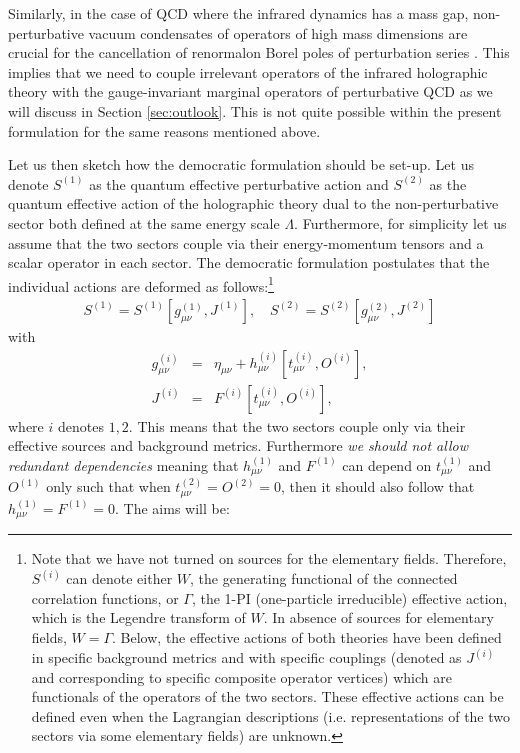 \documentclass[prd,reprint,a4paper,showpacs,superscriptaddress,11pt,onecolumn,nofootinbib]{revtex4-1}
\renewcommand{\(}{\left(}
\renewcommand{\)}{\right)}
\newcommand{\6}{\partial}
\begin{document}
Similarly, in the case of QCD where the infrared dynamics has a mass gap, non-perturbative vacuum condensates of operators of high mass dimensions are crucial for the cancellation of renormalon Borel poles of perturbation series \cite{Parisi:1978bj,Shifman:1978bx,citeulike:9712091}. This implies that we need to couple irrelevant operators of the infrared holographic theory with the gauge-invariant marginal operators of perturbative QCD as we will discuss in Section \ref{sec:outlook}. This is not quite possible within the present formulation for the same reasons mentioned above.

Let us then sketch how the democratic formulation should be set-up. Let us denote $S^{(1)}$ as the quantum effective perturbative action and $S^{(2)}$ as the quantum effective action of the holographic theory dual to the non-perturbative sector both defined at the same energy scale $\Lambda$. Furthermore, for simplicity let us assume that the two sectors couple via their energy-momentum tensors and a scalar operator in each sector. The democratic formulation postulates that the individual actions are deformed as follows:\footnote{Note that we have not turned on sources for the elementary fields. Therefore, $S^{(i)}$ can denote either $W$, the generating functional of the connected correlation functions, or $\Gamma$, the 1-PI (one-particle irreducible) effective action, which is the Legendre transform of $W$. In absence of sources for elementary fields, $W = \Gamma$. Below, the effective actions of both theories have been defined in specific background metrics and with specific couplings (denoted as $J^{(i)}$ and corresponding to specific composite operator vertices) which are functionals of the operators of the two sectors. These effective actions can be defined even when the Lagrangian descriptions (i.e. representations of the two sectors via some elementary fields) are unknown.}
\begin{eqnarray}\label{coupling-gen-1}
S^{(1)} = S^{(1)}[g^{(1)}_{\mu\nu}, J^{(1)}], \quad S^{(2)} = S^{(2)}[g^{(2)}_{\mu\nu}, J^{(2)}]
\end{eqnarray}
with 
\begin{eqnarray}\label{coupling-gen-2}
g^{(i)}_{\mu\nu} &=& \eta_{\mu\nu} + h^{(i)}_{\mu\nu}[t^{(i)}_{\mu\nu}, O^{(i)}], \nonumber\\
J^{(i)} &=& F^{(i)}[t^{(i)}_{\mu\nu}, O^{(i)}],
\end{eqnarray}
where $i$ denotes $1,2$. This means that the two sectors couple only via their effective sources and background metrics. Furthermore \textit{we should not allow redundant dependencies} meaning that $h^{(1)}_{\mu\nu}$ and $F^{(1)}$ can depend on $t^{(1)}_{\mu\nu}$ and $O^{(1)}$ only such that when $t^{(2)}_{\mu\nu} = O^{(2)} = 0$, then it should also follow that $h^{(1)}_{\mu\nu} = F^{(1)} = 0$. The aims will be:
\end{document}
